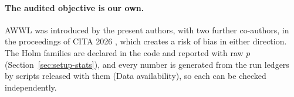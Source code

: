 \paragraph{The audited objective is our own.}
AWWL was introduced by the present authors, with two further co-authors, in the proceedings of CITA 2026
\citep{thao2026awwl}, which creates a risk of bias in either direction. The
Holm families are declared in the code and reported with raw $p$
(Section~\ref{sec:setup-stats}), and every number is generated from the run
ledgers by scripts released with them (Data availability), so each can be
checked independently.
